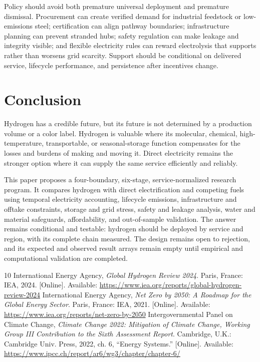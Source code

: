 \documentclass[conference]{IEEEtran}
\begin{document}
Policy should avoid both premature universal deployment and premature dismissal. Procurement can create verified demand for industrial feedstock or low-emissions steel; certification can align pathway boundaries; infrastructure planning can prevent stranded hubs; safety regulation can make leakage and integrity visible; and flexible electricity rules can reward electrolysis that supports rather than worsens grid scarcity. Support should be conditional on delivered service, lifecycle performance, and persistence after incentives change.

\section{Conclusion}
\label{sec:conclusion}
Hydrogen has a credible future, but its future is not determined by a production volume or a color label. Hydrogen is valuable where its molecular, chemical, high-temperature, transportable, or seasonal-storage function compensates for the losses and burdens of making and moving it. Direct electricity remains the stronger option where it can supply the same service efficiently and reliably.

This paper proposes a four-boundary, six-stage, service-normalized research program. It compares hydrogen with direct electrification and competing fuels using temporal electricity accounting, lifecycle emissions, infrastructure and offtake constraints, storage and grid stress, safety and leakage analysis, water and material safeguards, affordability, and out-of-sample validation. The answer remains conditional and testable: hydrogen should be deployed by service and region, with its complete chain measured. The design remains open to rejection, and its expected and observed result arrays remain empty until empirical and computational validation are completed.

\begin{thebibliography}{10}
 International Energy Agency, \emph{Global Hydrogen Review 2024}. Paris, France: IEA, 2024. [Online]. Available: \url{https://www.iea.org/reports/global-hydrogen-review-2024}
 International Energy Agency, \emph{Net Zero by 2050: A Roadmap for the Global Energy Sector}. Paris, France: IEA, 2021. [Online]. Available: \url{https://www.iea.org/reports/net-zero-by-2050}
 Intergovernmental Panel on Climate Change, \emph{Climate Change 2022: Mitigation of Climate Change, Working Group III Contribution to the Sixth Assessment Report}. Cambridge, U.K.: Cambridge Univ. Press, 2022, ch. 6, ``Energy Systems.'' [Online]. Available: \url{https://www.ipcc.ch/report/ar6/wg3/chapter/chapter-6/}
\end{thebibliography}
\end{document}
